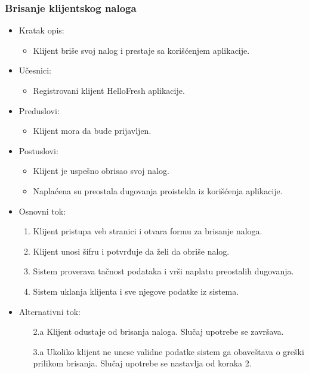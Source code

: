 \subsubsection{Brisanje klijentskog naloga}

\begin{itemize}
    \item Kratak opis:
        \begin{itemize}
            \item Klijent briše svoj nalog i prestaje sa korišćenjem aplikacije.
        \end{itemize}
    \item Učesnici:
        \begin{itemize}
            \item Registrovani klijent HelloFresh aplikacije.
        \end{itemize}
    \item Preduslovi:
        \begin{itemize}
            \item Klijent mora da bude prijavljen.
        \end{itemize}
    \item Postuslovi:
        \begin{itemize}
            \item Klijent je uspešno obrisao svoj nalog.
            \item Naplaćena su preostala dugovanja proistekla iz korišćenja aplikacije.
        \end{itemize}
    \item Osnovni tok:
        \begin{enumerate}
            \item Klijent pristupa veb stranici i otvara formu za brisanje naloga.
            \item Klijent unosi šifru i potvrđuje da želi da obriše nalog.
            \item Sistem proverava tačnost podataka i vrši naplatu preostalih dugovanja.
            \item Sistem uklanja klijenta i sve njegove podatke iz sistema.
        \end{enumerate}
    \item Alternativni tok:
        \begin{itemize}
            \item[2.a] Klijent odustaje od brisanja naloga. Slučaj upotrebe se završava.
			\item[3.a] Ukoliko klijent ne unese validne podatke sistem ga obaveštava o greški prilikom brisanja. Slučaj upotrebe se nastavlja od koraka 2.
        \end{itemize}
\end{itemize}
